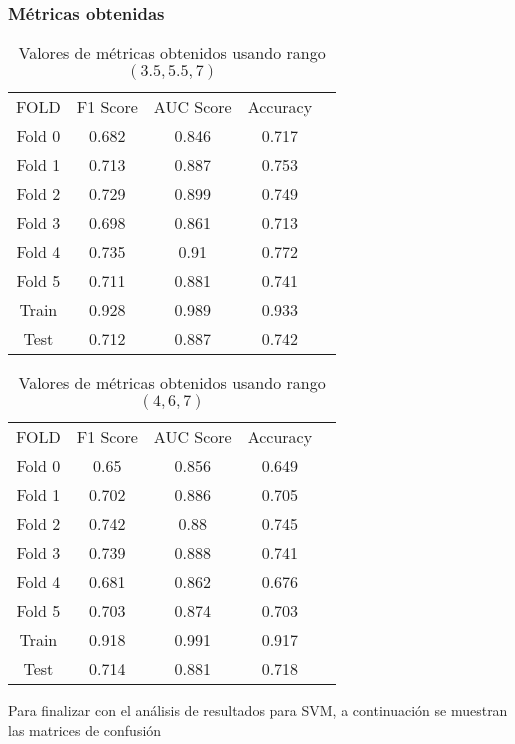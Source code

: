 \subsubsection*{Métricas obtenidas}
\begin{table}[H]
	\centering
	\begin{tabular}{|c|c|c|c|c}
		\cline{1-4}
		FOLD   & F1 Score & AUC Score & Accuracy \\ \cline{1-4}
		Fold 0 & 0.682    & 0.846     & 0.717    \\ \cline{1-4}
		Fold 1 & 0.713    & 0.887     & 0.753    \\ \cline{1-4}
		Fold 2 & 0.729    & 0.899     & 0.749    \\ \cline{1-4}
		Fold 3 & 0.698    & 0.861     & 0.713    \\ \cline{1-4}
		Fold 4 & 0.735    & 0.91      & 0.772    \\ \cline{1-4}
		Fold 5 & 0.711    & 0.881     & 0.741    \\ \cline{1-4}
		Train  & 0.928    & 0.989     & 0.933    \\ \cline{1-4}
		Test   & 0.712    & 0.887     & 0.742    \\ \cline{1-4}
	\end{tabular}
	\caption{Valores de métricas obtenidos usando rango $(3.5,5.5,7)$}
\end{table}
\begin{table}[H]
	\centering
	\begin{tabular}{|c|c|c|c|c}
		\cline{1-4}
		FOLD   & F1 Score & AUC Score & Accuracy \\ \cline{1-4}
		Fold 0 & 0.65     & 0.856     & 0.649    \\  \cline{1-4}
		Fold 1 & 0.702    & 0.886     & 0.705    \\  \cline{1-4}
		Fold 2 & 0.742    & 0.88      & 0.745    \\  \cline{1-4}
		Fold 3 & 0.739    & 0.888     & 0.741    \\  \cline{1-4}
		Fold 4 & 0.681    & 0.862     & 0.676    \\  \cline{1-4}
		Fold 5 & 0.703    & 0.874     & 0.703    \\  \cline{1-4}
		Train  & 0.918    & 0.991     & 0.917    \\  \cline{1-4}
		Test   & 0.714    & 0.881     & 0.718    \\  \cline{1-4}
	\end{tabular}
	\caption{Valores de métricas obtenidos usando rango $(4,6,7)$}
\end{table}
Para finalizar con el análisis de resultados para SVM, a continuación se muestran las matrices de confusión
